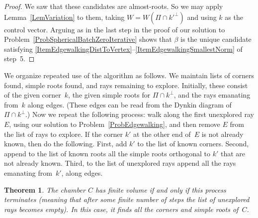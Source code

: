 \documentclass[12pt]{amsart}
\newtheorem{theorem}{Theorem}
\numberwithin{theorem}{section}
\numberwithin{equation}{section}
\numberwithin{figure}{section}
\theoremstyle{remark}
\begin{document}
\begin{proof}
    We saw that these candidates are almost-roots.
    So we may apply Lemma~\ref{LemVariation} 
    to them, taking 
    $W=W(\Pi\cap k'^\perp)$ and using $k$ as the control vector.
    Arguing as in the last step in the proof of
    our solution to Problem~\ref{ProbSphericalBatchZeroIterative} shows that $\beta$ is the unique candidate satisfying
    \eqref{ItemEdgewalkingDistToVertex}--\eqref{ItemEdgewalkingSmallestNorm} of step~5.%
\end{proof}

We organize repeated use of the algorithm as follows.  We maintain 
lists of corners found, simple roots found, and rays remaining to
explore.  Initially, these consist of the given corner~$k$, the 
given simple roots for $\Pi\cap k^\perp$, and the rays 
emanating from~$k$ along edges.  (These edges
can be read from the Dynkin diagram of
$\Pi\cap k^\perp$.)  Now we repeat the following process:
walk along the first unexplored
ray $E$,  using our solution to Problem~\ref{ProbEdgewalking}, and then remove $E$ from
the list of rays to explore.  
If the corner $k'$
at the other end of~$E$ is not already known, 
then do the following.  First, add $k'$ to the list of known
corners.  Second, append to the list of known roots
all the simple roots orthogonal to $k'$ that
are not already known.  Third, to the list of unexplored
rays append all the rays emanating from~$k'$, along edges.

\begin{theorem}
    \label{ThmComputesChamber}
    The chamber
    $C$ has finite volume if and only if this process terminates 
    (meaning that after
    some finite number of steps the list of unexplored rays
    becomes empty). 
    In this case, it finds all
    the
    corners and simple roots of~$C$.
\end{theorem}
\end{document}
